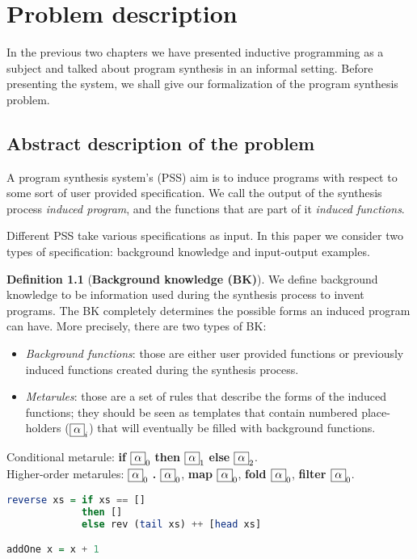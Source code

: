 \chapter{Problem description}
\indent \indent In the previous two chapters we have presented inductive programming as a subject and talked about program synthesis in an informal setting. Before presenting the system, we shall give our formalization of the program synthesis problem.

\section{Abstract description of the problem}
\theoremstyle{definition}
\newtheorem{defn}{Definition}

\theoremstyle{plain}
\newtheorem{claim}{Claim}
\newtheorem{thm}{Theorem}

\indent \indent A program synthesis system's (PSS) aim is to induce programs with respect to some sort of user provided specification. We call the output of the synthesis process \textit{induced program}, and the functions that are part of it \textit{induced functions}.
\par Different PSS take various specifications as input. In this paper we consider two types of specification: background knowledge and input-output examples.

\begin{defn}[\textbf{Background knowledge (BK)}]
We define background knowledge to be information used during the synthesis process to invent programs. The BK completely determines the possible forms an induced program can have. More precisely, there are two types of BK:
\begin{itemize}
	\item \textit{Background functions}: those are either user provided functions or previously induced functions created during the synthesis process.
	\item \textit{Metarules}: those are a set of rules that describe the forms of the induced functions;  they should be seen as templates that contain numbered place-holders ($ \fbox{$\alpha$}_{i} $) that will eventually be filled with background functions.
\end{itemize}
\end{defn}
\begin{exam}[Metarules]
\indent \indent Conditional metarule: \textbf{if} $\fbox{$\alpha$}_{0}$ \textbf{then} $\fbox{$\alpha$}_{1}$ \textbf{else} $\fbox{$\alpha$}_{2}$. \\
\indent Higher-order metarules: $\fbox{$\alpha$}_{0}$ \textbf{.} $\fbox{$\alpha$}_{0}$, \textbf{map $\fbox{$\alpha$}_{0}$}, \textbf{fold $\fbox{$\alpha$}_{0}$}, \textbf{filter $\fbox{$\alpha$}_{0}$}.
\end{exam}
\begin{exam}
\begin{lstlisting}[language=Haskell]
reverse xs = if xs == []
             then []
             else rev (tail xs) ++ [head xs]

addOne x = x + 1
\end{lstlisting}
\end{exam}

